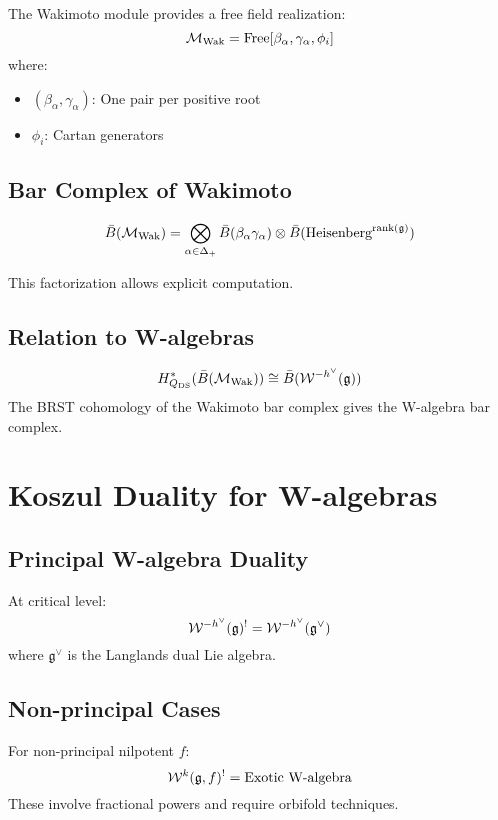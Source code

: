 The Wakimoto module provides a free field realization:
$$\mathcal{M}_{\text{Wak}} = \text{Free}[\beta_\alpha, \gamma_\alpha, \phi_i]$$
where:
\begin{itemize}
\item $(\beta_\alpha, \gamma_\alpha)$: One pair per positive root
\item $\phi_i$: Cartan generators
\end{itemize}

\subsection{Bar Complex of Wakimoto}

\begin{theorem}
$$\bar{B}(\mathcal{M}_{\text{Wak}}) = \bigotimes_{\alpha \in \Delta_+} \bar{B}(\beta_\alpha\gamma_\alpha) \otimes \bar{B}(\text{Heisenberg}^{\text{rank}(\mathfrak{g})})$$
\end{theorem}

This factorization allows explicit computation.

\subsection{Relation to W-algebras}

\begin{theorem}[DS Reduction]
$$H^*_{Q_{\text{DS}}}(\bar{B}(\mathcal{M}_{\text{Wak}})) \cong \bar{B}(\mathcal{W}^{-h^\vee}(\mathfrak{g}))$$
The BRST cohomology of the Wakimoto bar complex gives the W-algebra bar complex.
\end{theorem}

\section{Koszul Duality for W-algebras}

\subsection{Principal W-algebra Duality}

\begin{theorem}
At critical level:
$$\mathcal{W}^{-h^\vee}(\mathfrak{g})^! = \mathcal{W}^{-h^\vee}(\mathfrak{g}^\vee)$$
where $\mathfrak{g}^\vee$ is the Langlands dual Lie algebra.
\end{theorem}

\subsection{Non-principal Cases}

For non-principal nilpotent $f$:
$$\mathcal{W}^k(\mathfrak{g}, f)^! = \text{Exotic W-algebra}$$
These involve fractional powers and require orbifold techniques.